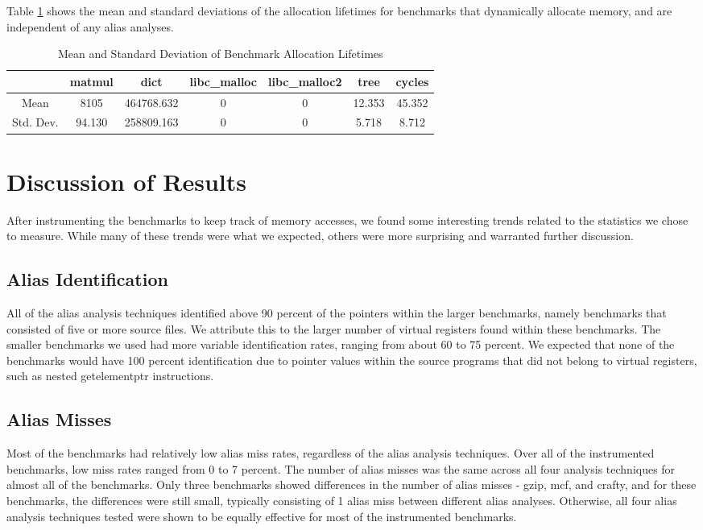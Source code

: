 Table \ref{table:7} shows the mean and standard deviations of the allocation lifetimes for benchmarks that dynamically allocate memory, and are independent of any alias analyses.

\begin{table} [h!]
\centering
   \begin{tabular} {|c|c c c c c c|}
      \hline
      & matmul & dict & libc\_malloc & libc\_malloc2 & tree & cycles \\
      \hline
      Mean & 8105 & 464768.632 & 0 & 0 & 12.353 & 45.352 \\
      \hline
      Std. Dev. & 94.130 & 258809.163 & 0 & 0 & 5.718 & 8.712 \\
      \hline
   \end{tabular}
   \caption{Mean and Standard Deviation of Benchmark Allocation Lifetimes}
   \label{table:7}
\end{table}

\section{Discussion of Results}
After instrumenting the benchmarks to keep track of memory accesses, we found some interesting trends related to the statistics we chose to measure. While many of these trends were what we expected, others were more surprising and warranted further discussion.

\subsection{Alias Identification}
All of the alias analysis techniques identified above 90 percent of the pointers within the larger benchmarks, namely benchmarks that consisted of five or more source files. We attribute this to the larger number of virtual registers found within these benchmarks. The smaller benchmarks we used had more variable identification rates, ranging from about 60 to 75 percent. We expected that none of the benchmarks would have 100 percent identification due to pointer values within the source programs that did not belong to virtual registers, such as nested getelementptr instructions.

\subsection{Alias Misses}
Most of the benchmarks had relatively low alias miss rates, regardless of the alias analysis techniques. Over all of the instrumented benchmarks, low miss rates ranged from 0 to 7 percent. The number of alias misses was the same across all four analysis techniques for almost all of the benchmarks. Only three benchmarks showed differences in the number of alias misses - gzip, mcf, and crafty, and for these benchmarks, the differences were still small, typically consisting of 1 alias miss between different alias analyses. Otherwise, all four alias analysis techniques tested were shown to be equally effective for most of the instrumented benchmarks.

